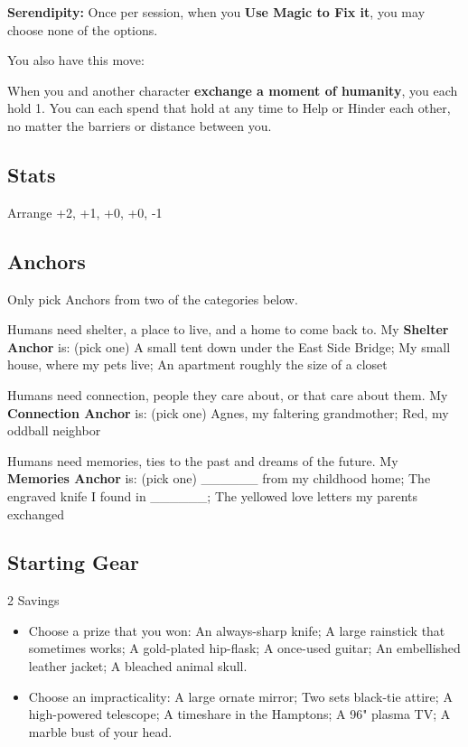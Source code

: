 \documentclass[10pt,twoside,openright]{memoir}
\begin{document}
\textbf{Serendipity:} Once per session, when you \textbf{Use Magic to
Fix it}, you may choose none of the options.

You also have this move:

When you and another character \textbf{exchange a moment of humanity},
you each hold 1. You can each spend that hold at any time to Help or
Hinder each other, no matter the barriers or distance between you.

\hypertarget{stats-6}{%
\subsection{Stats}\label{stats-6}}

Arrange +2, +1, +0, +0, -1

\hypertarget{anchors-5}{%
\subsection{Anchors}\label{anchors-5}}

Only pick Anchors from two of the categories below.

Humans need shelter, a place to live, and a home to come back to. My
\textbf{Shelter Anchor} is: (pick one) A small tent down under the East
Side Bridge; My small house, where my pets live; An apartment roughly
the size of a closet

Humans need connection, people they care about, or that care about them.
My \textbf{Connection Anchor} is: (pick one) Agnes, my faltering
grandmother; Red, my oddball neighbor

Humans need memories, ties to the past and dreams of the future. My
\textbf{Memories Anchor} is: (pick one) \_\_\_\_\_\_ from my childhood
home; The engraved knife I found in \_\_\_\_\_\_; The yellowed love
letters my parents exchanged

\hypertarget{starting-gear-5}{%
\subsection{Starting Gear}\label{starting-gear-5}}

2 Savings

\begin{itemize}
\tightlist
\item
  Choose a prize that you won: An always-sharp knife; A large rainstick
  that sometimes works; A gold-plated hip-flask; A once-used guitar; An
  embellished leather jacket; A bleached animal skull.
\item
  Choose an impracticality: A large ornate mirror; Two sets black-tie
  attire; A high-powered telescope; A timeshare in the Hamptons; A 96"
  plasma TV; A marble bust of your head.
\end{itemize}
\end{document}
